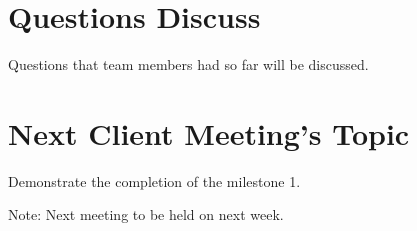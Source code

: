 \documentclass[11pt, a4paper]{article}
\begin{document}
\section{Questions Discuss}
Questions that team members had so far will be discussed.

\section{Next Client Meeting's Topic}
Demonstrate the completion of the milestone 1. 

\vspace*{10pt}
\noindent Note: Next meeting to be held on next week.
\end{document}
